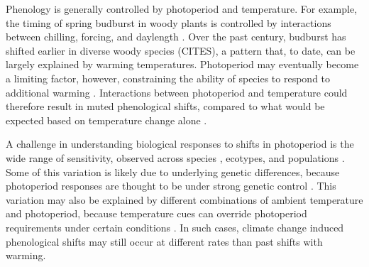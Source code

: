 \documentclass{article}
\begin{document}
\par Phenology is generally controlled by photoperiod and temperature. For example, the timing of spring budburst in woody plants is controlled by interactions between chilling, forcing, and daylength \citep{flynn2018,Heide:2008aa, zohner2016}. Over the past century, budburst has shifted earlier in diverse woody species (CITES), a pattern that, to date, can be largely explained by warming temperatures. Photoperiod may eventually become a limiting factor, however, constraining the ability of species to respond to additional warming \citep{koerner2010b,vitasse2013, Morin:2010aa,Nienstaedt:1966aa}. Interactions between photoperiod and temperature could therefore result in muted phenological shifts, compared to what would be expected based on temperature change alone \citep{wareing1956,mimura2007,koerner2010b}.
\par A challenge in understanding biological responses to shifts in photoperiod is the wide range of sensitivity, observed across species \citep{Sanz-Perez:2009aa, zohner2016,flynn2018}, ecotypes\citep{Howe:1995aa}, and populations \citep{tanino2010}. Some of this variation is likely due to underlying genetic differences, because photoperiod responses are thought to be under strong genetic control \cite{bradshaw1995,weih2004,keller2011}. This variation may also be explained by different combinations of ambient temperature and photoperiod, because temperature cues can override photoperiod requirements under certain conditions \citep [e.g., during growth cessation][] {tanino2010}. In such cases, climate change induced phenological shifts may still occur at different rates than past shifts with warming. 
\end{document}
